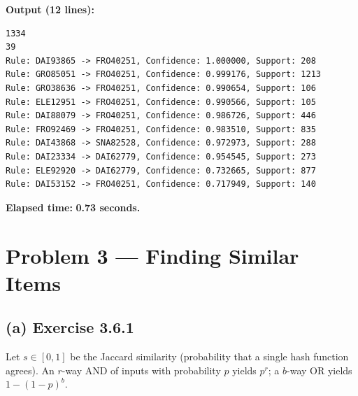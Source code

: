 \documentclass[11pt,a4paper]{article}
\begin{document}
\textbf{Output (12 lines):}
\begin{lstlisting}
1334
39
Rule: DAI93865 -> FRO40251, Confidence: 1.000000, Support: 208
Rule: GRO85051 -> FRO40251, Confidence: 0.999176, Support: 1213
Rule: GRO38636 -> FRO40251, Confidence: 0.990654, Support: 106
Rule: ELE12951 -> FRO40251, Confidence: 0.990566, Support: 105
Rule: DAI88079 -> FRO40251, Confidence: 0.986726, Support: 446
Rule: FRO92469 -> FRO40251, Confidence: 0.983510, Support: 835
Rule: DAI43868 -> SNA82528, Confidence: 0.972973, Support: 288
Rule: DAI23334 -> DAI62779, Confidence: 0.954545, Support: 273
Rule: ELE92920 -> DAI62779, Confidence: 0.732665, Support: 877
Rule: DAI53152 -> FRO40251, Confidence: 0.717949, Support: 140
\end{lstlisting}

\textbf{Elapsed time:} \textbf{0.73 seconds.}

\section{Problem 3 — Finding Similar Items}

\subsection*{(a) Exercise 3.6.1}

Let $s \in [0,1]$ be the Jaccard similarity (probability that a single hash function agrees).
An $r$-way AND of inputs with probability $p$ yields $p^r$;
a $b$-way OR yields $1-(1-p)^b$.
\end{document}
